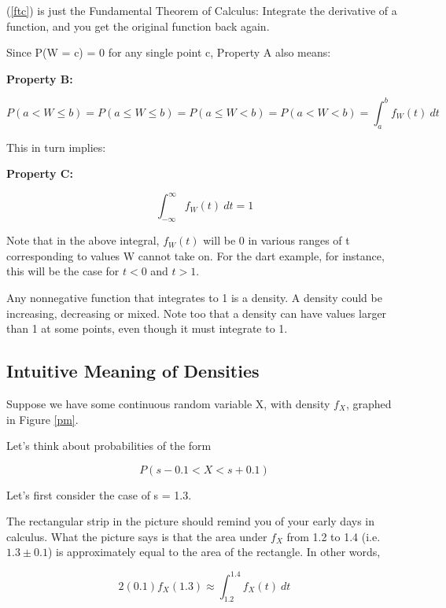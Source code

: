 (\ref{ftc}) is just the Fundamental Theorem of Calculus:  Integrate the
derivative of a function, and you get the original function back again.

Since P(W = c) = 0 for any single point c, Property A also means:

{\bf Property B:}

\begin{equation}
P(a < W \leq b) = 
P(a \leq W \leq b) = 
P(a \leq W < b) = 
P(a < W < b) = 
\int_{a}^{b} f_W(t) ~ dt
\end{equation}

This in turn implies: 

{\bf Property C:}

\begin{equation}
\label{total1}
\int_{-\infty}^{\infty} f_W(t) ~ dt = 1
\end{equation}

Note that in the above integral, $f_W(t)$ will be 0 in various ranges of
t corresponding to values W cannot take on.  For the dart example, for
instance, this will be the case for $t < 0$ and $t > 1$.

Any nonnegative function that integrates to 1 is a density.  A density
could be increasing, decreasing or mixed.  Note too that a density can
have values larger than 1 at some points, even though it must integrate
to 1.  

\subsection{Intuitive Meaning of Densities}

Suppose we have some continuous random variable X, with density $f_X$,
graphed in Figure \ref{pm}.

Let's think about probabilities of the form 

\begin{equation}
P(s - 0.1 < X < s + 0.1)
\end{equation}

Let's first consider the case of s = 1.3.

The rectangular strip in the picture should remind you of your early
days in calculus.  What the picture says is that the area under $f_X$
from 1.2 to 1.4 (i.e.\ $1.3 \pm 0.1$) is approximately equal to the area
of the rectangle.  In other words,

\begin{equation}
2 (0.1) f_X(1.3) \approx \int_{1.2}^{1.4} f_X(t) ~ dt 
\end{equation}

